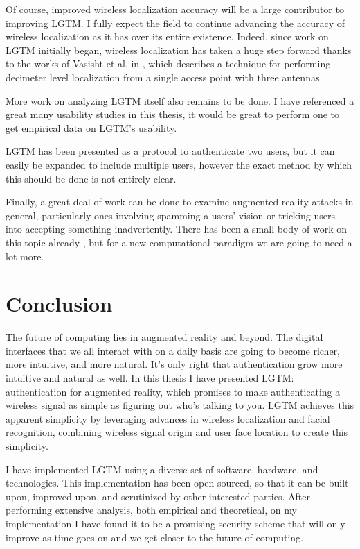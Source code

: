 \documentclass[12pt]{report}
\begin{document}
Of course, improved wireless localization accuracy will be a large contributor to improving LGTM. I fully expect the field to continue advancing the accuracy of wireless localization as it has over its entire existence. Indeed, since work on LGTM initially began, wireless localization has taken a huge step forward thanks to the works of Vasisht et al. in \cite{ChronosSingleAPLocalizationVasisht2016}, which describes a technique for performing decimeter level localization from a single access point with three antennas. \par

More work on analyzing LGTM itself also remains to be done. I have referenced a great many usability studies in this thesis, it would be great to perform one to get empirical data on LGTM's usability. \par

LGTM has been presented as a protocol to authenticate two users, but it can easily be expanded to include multiple users, however the exact method by which this should be done is not entirely clear. \par

Finally, a great deal of work can be done to examine augmented reality attacks in general, particularly ones involving spamming a users' vision or tricking users into accepting something inadvertently. There has been a small body of work on this topic already \cite{SafelyAugmentLebeck2016,SecurityAndPrivacyForARRoesner2014}, but for a new computational paradigm we are going to need a lot more. \par


\section{Conclusion}
The future of computing lies in augmented reality and beyond. The digital interfaces that we all interact with on a daily basis are going to become richer, more intuitive, and more natural. It's only right that authentication grow more intuitive and natural as well. In this thesis I have presented LGTM: authentication for augmented reality, which promises to make authenticating a wireless signal as simple as figuring out who's talking to you. LGTM achieves this apparent simplicity by leveraging advances in wireless localization and facial recognition, combining wireless signal origin and user face location to create this simplicity. \par

I have implemented LGTM using a diverse set of software, hardware, and technologies. This implementation has been open-sourced, so that it can be built upon, improved upon, and scrutinized by other interested parties. After performing extensive analysis, both empirical and theoretical, on my implementation I have found it to be a promising security scheme that will only improve as time goes on and we get closer to the future of computing. \par
\end{document}
